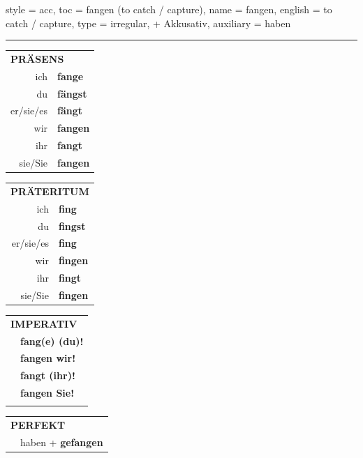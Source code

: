 \begin{verbentry}{
  style = {acc},
  toc = {fangen (to catch / capture)},
  name = {fangen},
  english = {to catch / capture},
  type = {irregular, + Akkusativ},
  auxiliary = {haben}
}
 
    
     \vspace{5pt}

    \hrule
    
    \vspace{5pt}

  \begin{tabular}{rl}
     \multicolumn{2}{l}{\textbf{PRÄSENS} }\\
    ich & \textbf{fange}\\
    du & \textbf{fängst}\\
    er/sie/es & \textbf{fängt}\\
    wir & \textbf{fangen}\\
    ihr & \textbf{fangt}\\
    sie/Sie & \textbf{fangen}\\
  \end{tabular}
  \hfill
     \begin{tabular}{rl}
    \multicolumn{2}{l}{\textbf{PRÄTERITUM} }\\
    ich & \textbf{fing}\\
    du & \textbf{fingst}\\
    er/sie/es & \textbf{fing}\\
    wir & \textbf{fingen}\\
    ihr & \textbf{fingt}\\
    sie/Sie & \textbf{fingen}\\
  \end{tabular}
  \hfill
  \begin{tabular}{rl}
     \multicolumn{2}{l}{\textbf{IMPERATIV} }\\
   & \textbf{fang(e) (du)!}\\
   & \textbf{fangen wir!}\\
   & \textbf{fangt (ihr)!}\\
   & \textbf{fangen Sie!}\\
   & \vspace{10pt}
  \end{tabular}

    \vspace{10pt}

 \begin{tabular}{rl}
     \multicolumn{2}{l}{\textbf{PERFEKT}}\\
  &  haben + \textbf{gefangen}\\
  \end{tabular}
\hfill
   \begin{tabular}{rl}
   

\end{tabular}
\end{verbentry}
